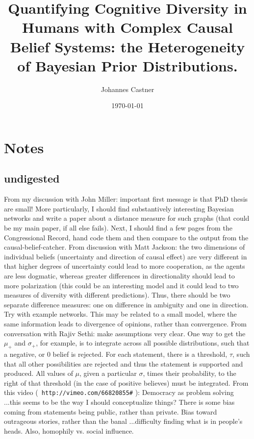 \documentclass[12pt]{article}
\begin{document}
%

\title{Quantifying Cognitive Diversity in Humans with Complex Causal Belief Systems: the Heterogeneity of Bayesian Prior Distributions.}
\author{Johannes  Castner}		%

\date \today	
\maketitle
 
\section{Notes}
\subsection{undigested}
From my discussion with John Miller: important first message is that PhD thesis are small! More particularly, I should find substantively interesting Bayesian networks and write a paper about a distance measure for such graphs (that could be my main paper, if all else fails). Next, I should find a few pages from the Congressional Record, hand code them and then compare to the output from the causal-belief-catcher. From discussion with Matt Jackson: the two dimensions of individual beliefs (uncertainty and direction of causal effect) are very different in that higher degrees of uncertainty could lead to more cooperation, as the agents are less dogmatic, whereas greater differences in directionality should lead to more polarization (this could be an interesting model and it could lead to two measures of diversity with different predictions). Thus, there should be two separate difference measures: one on difference in ambiguity and one in direction. Try with example networks. This may be related to a small model, where the same information leads to divergence of opinions, rather than convergence. From conversation with Rajiv Sethi: make assumptions very clear. One way to get the $\mu_+$ and $\sigma_+$, for example, is to integrate across all possible distributions, such that a negative, or $0$ belief is rejected. For each statement, there is a threshold, $\tau$, such that all other possibilities are rejected and thus the statement is supported and produced. All values of $\mu$, given a particular $\sigma$, times their probability, to the right of that threshold (in the case of positive believes) must be integrated. From this video (\verb| http://vimeo.com/66820855#| ): Democracy as problem solving ...this seems to be the way I should conceptualize things? There is some bias coming from statements being public, rather than private. Bias toward outrageous stories, rather than the banal ...difficulty finding what is in people's heads. Also, homophily vs. social influence.      
\end{document}
